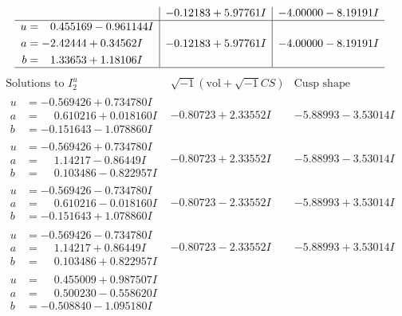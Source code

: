 \documentclass[1p]{elsarticle_modified}
\theoremstyle{definition}
\newcommand{\I}{\sqrt{-1}}
\begin{document}
$$\begin{array}{c|c|c}
 & -0.12183 + 5.97761 I & -4.00000 - 8.19191 I \\ \hline\begin{aligned}
u &= \phantom{-}0.455169 - 0.961144 I \\
a &= -2.42444 + 0.34562 I \\
b &= \phantom{-}1.33653 + 1.18106 I\end{aligned}
 & -0.12183 + 5.97761 I & -4.00000 - 8.19191 I\\
 \hline 
 \end{array}$$\newpage$$\begin{array}{c|c|c}  
\text{Solutions to }I^u_{2}& \I (\text{vol} + \sqrt{-1}CS) & \text{Cusp shape}\\
 \hline 
\begin{aligned}
u &= -0.569426 + 0.734780 I \\
a &= \phantom{-}0.610216 + 0.018160 I \\
b &= -0.151643 - 1.078860 I\end{aligned}
 & -0.80723 + 2.33552 I & -5.88993 - 3.53014 I \\ \hline\begin{aligned}
u &= -0.569426 + 0.734780 I \\
a &= \phantom{-}1.14217 - 0.86449 I \\
b &= \phantom{-}0.103486 - 0.822957 I\end{aligned}
 & -0.80723 + 2.33552 I & -5.88993 - 3.53014 I \\ \hline\begin{aligned}
u &= -0.569426 - 0.734780 I \\
a &= \phantom{-}0.610216 - 0.018160 I \\
b &= -0.151643 + 1.078860 I\end{aligned}
 & -0.80723 - 2.33552 I & -5.88993 + 3.53014 I \\ \hline\begin{aligned}
u &= -0.569426 - 0.734780 I \\
a &= \phantom{-}1.14217 + 0.86449 I \\
b &= \phantom{-}0.103486 + 0.822957 I\end{aligned}
 & -0.80723 - 2.33552 I & -5.88993 + 3.53014 I \\ \hline\begin{aligned}
u &= \phantom{-}0.455009 + 0.987507 I \\
a &= \phantom{-}0.500230 - 0.558620 I \\
b &= -0.508840 - 1.095180 I\end{aligned}

\end{array}$$
\end{document}
